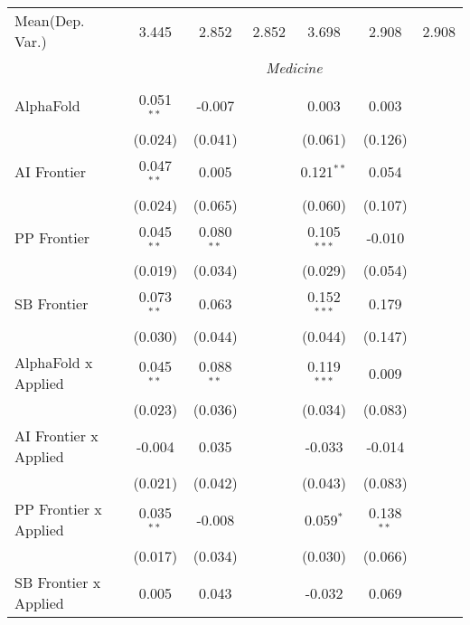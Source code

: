 \begin{tabular}{lcccccc}
Mean(Dep. Var.) & 3.445 & 2.852 & 2.852 & 3.698 & 2.908 & 2.908 \\
 & \multicolumn{6}{c}{\textit{Medicine}} \\ \\
   AlphaFold                      & 0.051$^{**}$ & -0.007       &               & 0.003         & 0.003        &   \\   
                                  & (0.024)      & (0.041)      &               & (0.061)       & (0.126)      &   \\   
   AI Frontier                    & 0.047$^{**}$ & 0.005        &               & 0.121$^{**}$  & 0.054        &   \\   
                                  & (0.024)      & (0.065)      &               & (0.060)       & (0.107)      &   \\   
   PP Frontier                    & 0.045$^{**}$ & 0.080$^{**}$ &               & 0.105$^{***}$ & -0.010       &   \\   
                                  & (0.019)      & (0.034)      &               & (0.029)       & (0.054)      &   \\   
   SB Frontier                    & 0.073$^{**}$ & 0.063        &               & 0.152$^{***}$ & 0.179        &   \\   
                                  & (0.030)      & (0.044)      &               & (0.044)       & (0.147)      &   \\   
   AlphaFold x Applied            & 0.045$^{**}$ & 0.088$^{**}$ &               & 0.119$^{***}$ & 0.009        &   \\   
                                  & (0.023)      & (0.036)      &               & (0.034)       & (0.083)      &   \\   
   AI Frontier x Applied          & -0.004       & 0.035        &               & -0.033        & -0.014       &   \\   
                                  & (0.021)      & (0.042)      &               & (0.043)       & (0.083)      &   \\   
   PP Frontier x Applied          & 0.035$^{**}$ & -0.008       &               & 0.059$^{*}$   & 0.138$^{**}$ &   \\   
                                  & (0.017)      & (0.034)      &               & (0.030)       & (0.066)      &   \\   
   SB Frontier x Applied          & 0.005        & 0.043        &               & -0.032        & 0.069        &   \\   

\end{tabular}
